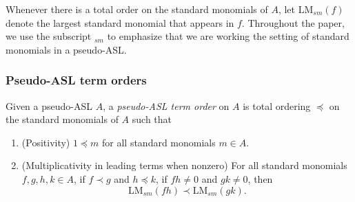 \documentclass[11pt,reqno]{amsart}
\newcommand{\lmsm}{\text{LM}_{sm}}
\theoremstyle{definition}
\numberwithin{equation}{section}
\begin{document}
\begin{notation}[store=notlmsm, note={Leading monomial}]
Whenever there is a total order on the standard monomials of $A$, let $\lmsm(f)$ denote the largest standard monomial that appears in $f$. Throughout the paper, we use the subscript $_{sm}$ to emphasize that we are working the setting of standard monomials in a pseudo-ASL.
\end{notation}

\subsubsection{Pseudo-ASL term orders}

\begin{definition}[store=deftermorder, note=Pseudo-ASL term order]
\label{def:termorder}
Given a pseudo-ASL $A$, a \emph{pseudo-ASL term order} on $A$ is total ordering $\preceq$ on the standard monomials of $A$ such that 

\begin{enumerate}[label=(\textbf{ATO-\arabic*}),ref=(\textbf{ATO-\arabic*})]
\item \label{def:termorder:positive} (Positivity) $1 \preceq m$ for all standard monomials $m \in A$.
\item \label{def:termorder:mult} (Multiplicativity in leading terms when nonzero) For all standard monomials $f,g,h,k \in A$, if $f \prec g$ and $h \preceq k$, if $fh \neq 0$ and $gk \neq 0$, then
\[
\lmsm(fh) \prec \lmsm(gk).
\]
\end{enumerate}
\end{definition}
\end{document}

